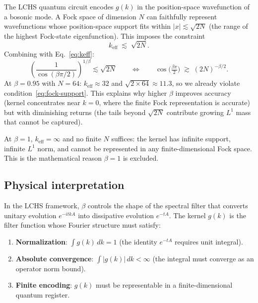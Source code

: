 \documentclass[11pt]{article}
\begin{document}
The LCHS quantum circuit encodes $g(k)$ in the position-space
wavefunction of a bosonic mode.  A Fock space of dimension $N$ can
faithfully represent wavefunctions whose position-space support fits
within $|x| \lesssim \sqrt{2N}$ (the range of the highest Fock-state
eigenfunction).  This imposes the constraint
\begin{equation}\label{eq:fock-support}
  k_{\mathrm{eff}} \;\lesssim\; \sqrt{2N}.
\end{equation}
Combining with Eq.~\eqref{eq:keff}:
\begin{equation}\label{eq:beta-N-constraint}
  \left(\frac{1}{\cos(\beta\pi/2)}\right)^{1/\beta} \lesssim \sqrt{2N}
  \qquad\Longleftrightarrow\qquad
  \cos\!\bigl(\tfrac{\beta\pi}{2}\bigr)
  \;\gtrsim\; (2N)^{-\beta/2}.
\end{equation}
At $\beta = 0.95$ with $N = 64$: $k_{\mathrm{eff}} \approx 32$ and
$\sqrt{2 \times 64} \approx 11.3$, so we already violate
condition~\eqref{eq:fock-support}.  This explains why higher $\beta$
improves accuracy (kernel concentrates near $k = 0$, where the finite
Fock representation is accurate) but with diminishing returns (the
tails beyond $\sqrt{2N}$ contribute growing $L^1$ mass that cannot
be captured).

At $\beta = 1$, $k_{\mathrm{eff}} = \infty$ and no finite $N$ suffices:
the kernel has infinite support, infinite $L^1$ norm, and cannot be
represented in any finite-dimensional Fock space.  This is the
mathematical reason $\beta = 1$ is excluded.

\subsection{Physical interpretation}

In the LCHS framework, $\beta$ controls the shape of the spectral
filter that converts unitary evolution $e^{-itkA}$ into dissipative
evolution $e^{-tA}$.  The kernel $g(k)$ is the filter function whose
Fourier structure must satisfy:
\begin{enumerate}[itemsep=2pt]
  \item \textbf{Normalization}: $\int g(k)\,dk = 1$ (the identity
        $e^{-tA}$ requires unit integral).
  \item \textbf{Absolute convergence}: $\int |g(k)|\,dk < \infty$
        (the integral must converge as an operator norm bound).
  \item \textbf{Finite encoding}: $g(k)$ must be representable in
        a finite-dimensional quantum register.
\end{enumerate}
\end{document}
